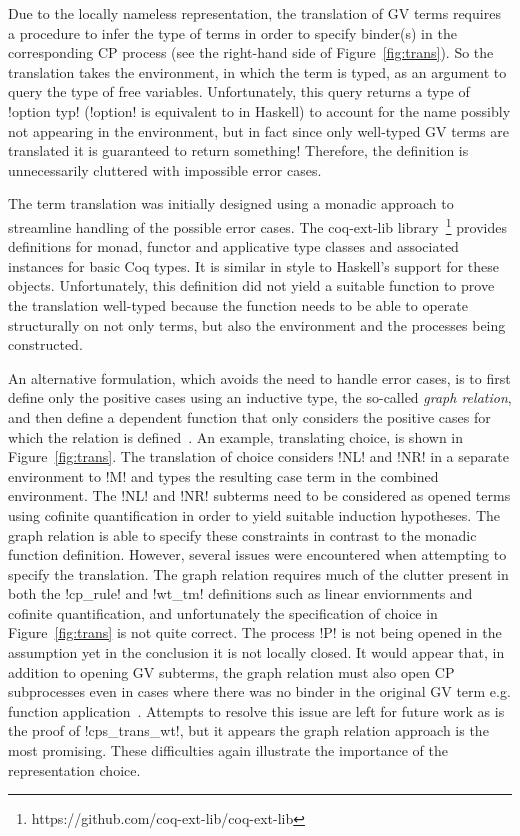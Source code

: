 Due to the locally nameless representation, the translation of GV terms
requires a procedure to infer the type of terms in order to specify binder(s)
in the corresponding CP process (see the right-hand side of
Figure~\ref{fig:trans}). So the translation takes the environment, in which
the term is typed, as an argument to query the type of free
variables. Unfortunately, this query returns a type of \coqe!option typ!
(\coqe!option! is equivalent to  in Haskell) to account for the name
possibly not appearing in the environment, but in fact since only well-typed
GV terms are translated it is guaranteed to return something! Therefore, the
definition is unnecessarily cluttered with impossible error cases.

The term translation was initially designed using a monadic approach to
streamline handling of the possible error cases. The coq-ext-lib
library~\footnote{https://github.com/coq-ext-lib/coq-ext-lib} provides
definitions for monad, functor and applicative type classes and associated
instances for basic Coq types. It is similar in style to Haskell's support for
these objects. Unfortunately, this definition did not yield a suitable
function to prove the translation well-typed because the function needs to be
able to operate structurally on not only terms, but also the environment and
the processes being constructed.

An alternative formulation, which avoids the need to handle error cases, is to
first define only the positive cases using an inductive type, the so-called
\textit{graph relation}, and then define a dependent function that only
considers the positive cases for which the relation is
defined~\cite{McKinna:2009}. An example, translating choice, is shown in
Figure~\ref{fig:trans}. The translation of choice considers \coqe!NL! and
\coqe!NR! in a separate environment to \coqe!M! and types the resulting case
term in the combined environment. The \coqe!NL! and \coqe!NR! subterms need to
be considered as opened terms using cofinite quantification in order to yield
suitable induction hypotheses. The graph relation is able to specify these
constraints in contrast to the monadic function definition. However, several
issues were encountered when attempting to specify the translation. The graph
relation requires much of the clutter present in both the \coqe!cp_rule! and
\coqe!wt_tm! definitions such as linear enviornments and cofinite
quantification, and unfortunately the specification of choice in
Figure~\ref{fig:trans} is not quite correct. The process \coqe!P! is not being
opened in the  assumption yet in the conclusion it is not locally
closed. It would appear that, in addition to opening GV subterms, the graph
relation must also open CP subprocesses even in cases where there was no
binder in the original GV term e.g. function
application~\cite{Wadler:2014}. Attempts to resolve this issue are left for
future work as is the proof of \coqe!cps_trans_wt!, but it appears the graph
relation approach is the most promising. These difficulties again illustrate
the importance of the representation choice.

